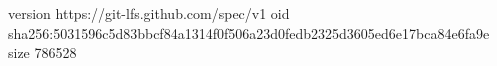 version https://git-lfs.github.com/spec/v1
oid sha256:5031596c5d83bbcf84a1314f0f506a23d0fedb2325d3605ed6e17bca84e6fa9e
size 786528
